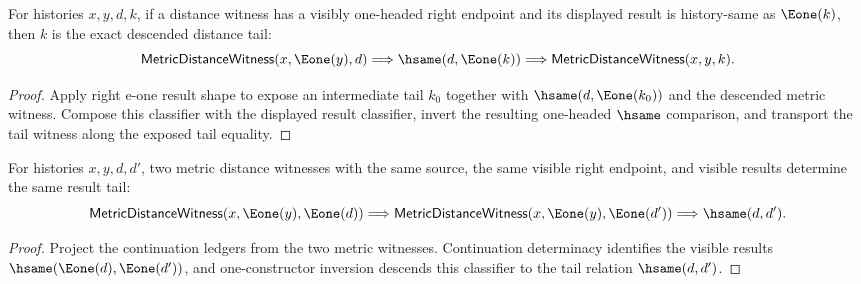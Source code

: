 \begin{theorem}
\label{thm:metric-distance-witness-right-e1-result-tail-hsame-exact}
For histories $x,y,d,k$, if a distance witness has a visibly one-headed right
endpoint and its displayed result is history-same as $\Eone(k)$, then $k$ is
the exact descended distance tail:
$$
\mathsf{MetricDistanceWitness}(x,\Eone(y),d)\Longrightarrow
\hsame(d,\Eone(k))\Longrightarrow
\mathsf{MetricDistanceWitness}(x,y,k).
$$
\end{theorem}
\begin{proof}
Apply right e-one result shape to expose an intermediate tail $k_0$ together
with $\hsame(d,\Eone(k_0))$ and the descended metric witness. Compose this
classifier with the displayed result classifier, invert the resulting
one-headed $\hsame$ comparison, and transport the tail witness along the
exposed tail equality.
\end{proof}

\begin{theorem}
\label{thm:metric-distance-witness-right-e1-result-tail-deterministic}
For histories $x,y,d,d'$, two metric distance witnesses with the same source,
the same visible right endpoint, and visible results determine the same result
tail:
$$
\mathsf{MetricDistanceWitness}(x,\Eone(y),\Eone(d))
\Longrightarrow
\mathsf{MetricDistanceWitness}(x,\Eone(y),\Eone(d'))
\Longrightarrow
\hsame(d,d').
$$
\end{theorem}
\begin{proof}
Project the continuation ledgers from the two metric witnesses. Continuation
determinacy identifies the visible results
$\hsame(\Eone(d),\Eone(d'))$, and one-constructor inversion descends this
classifier to the tail relation $\hsame(d,d')$.
\end{proof}

